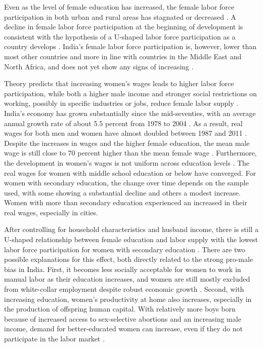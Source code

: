 \documentclass[12pt,letterpaper]{article}
\begin{document}
Even as the level of female education has increased, the female labor force participation 
in both urban and rural areas has stagnated or decreased
\citep{Klasen2015,Afridi2018,Bhargava2018,Chatterjee2018, Bhargava2019}.
A decline in female labor force participation at the beginning of development is
consistent with the hypothesis of a U-shaped labor force participation as a country
develops \citep{Goldin1994}.
India's female labor force participation is, however, lower than most other
countries and more in line with countries in the Middle East and North Africa, and
does not yet show any signs of increasing
\citep{Klasen2015,Chatterjee2018}.

Theory predicts that increasing women's wages leads to higher labor force participation, 
while both a higher male income and stronger social restrictions on working, possibly in 
specific industries or jobs, reduce female labor supply \citep{Goldin1994}.
India's economy has grown substantially since the mid-seventies, with
an average annual growth rate of about 5.5 percent from 1978 to 2004 \citet{Bosworth2008}.
As a result, real wages for both men and women have almost doubled between 1987 and 2011 
\citep{Klasen2015}.
Despite the increases in wages and the higher female education, the mean male wage is
still close to 70 percent higher than the mean female wage \citep{Bhargava2018}.
Furthermore, the development in women's wages is not uniform across education 
levels \citep{Klasen2015,Bhargava2018}.
The real wages for women with middle school education or below have converged. 
For women with secondary education, the change over time depends on the sample used,
with some showing a substantial decline and others a modest increase.
Women with more than secondary education experienced an increased in their real 
wages, especially in cities.

After controlling for household characteristics and husband income, there is
still a U-shaped relationship between female education and labor supply with the
lowest labor force participation for women with secondary education \citep{Chatterjee2018}.
There are two possible explanations for this effect, both directly related to the strong
pro-male bias in India.
First, it becomes less socially acceptable for women to work in manual labor as their
education increases, and women are still mostly excluded from white-collar
employment despite robust economic growth \citep{Klasen2015,Chatterjee2018}.
Second, with increasing education, women's productivity at home also increases, especially
in the production of offspring human capital.
With relatively more boys born because of increased access to sex-selective 
abortions and an increasing male income, demand for better-educated women can 
increase, even if they do not participate in the labor market \citep{Behrman1999}.
\end{document}

